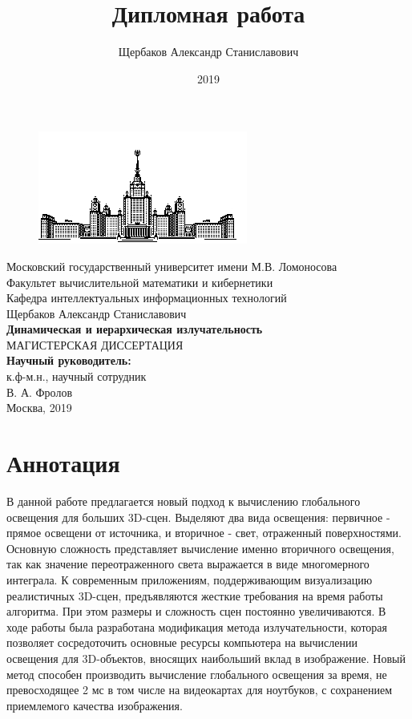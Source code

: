\documentclass[oneside,final,12pt, a4paper]{extreport}
\newcommand{\sect}[1]{%
  \newpage%
  \section*{#1}%
  \addcontentsline{toc}{section}{#1}}
\begin{document}
\title{Дипломная работа}
\author{Щербаков Александр Станиславович}
\date{2019}
\begin{titlepage}
  \begin{center}
    \begin{figure}[h!]
      \center    
      \includegraphics{title/msu.jpg}
    \end{figure}
    Московский государственный университет имени М.В. Ломоносова\\
    Факультет вычислительной математики и кибернетики\\
    Кафедра интеллектуальных информационных технологий\\
    \vspace{2.3cm}
    {\LARGE Щербаков Александр Станиславович \\
    \vspace{1.24cm}
    \textbf{Динамическая и иерархическая излучательность\\}
    \vspace{2.2cm}
    МАГИСТЕРСКАЯ ДИССЕРТАЦИЯ \\
    }
    \vspace{3.4cm}
    \hfill { \bf Научный руководитель:\\}
    \hfill к.ф-м.н., научный сотрудник\\
    \hfill В. А. Фролов \\
    \vfill Москва, 2019
  \end{center}
\end{titlepage}
\pagebreak


\tableofcontents

\sect{Аннотация}

В данной работе предлагается новый подход к вычислению глобального освещения для больших 3D-сцен. Выделяют два вида освещения: первичное - прямое освещени от источника, и вторичное - свет, отраженный поверхностями. Основную сложность представляет вычисление именно вторичного освещения, так как значение переотраженного света выражается в виде многомерного интеграла. К современным приложениям, поддерживающим визуализацию реалистичных 3D-сцен, предъявляются жесткие требования на время работы алгоритма. При этом размеры и сложность сцен постоянно увеличиваются.
В ходе работы была разработана модификация метода излучательности, которая позволяет сосредоточить основные ресурсы компьютера на вычислении освещения для 3D-объектов, вносящих наибольший вклад в изображение. Новый метод способен производить вычисление глобального освещения за время, не превосходящее 2 мс в том числе на видеокартах для ноутбуков, с сохранением приемлемого качества изображения.
\end{document}
